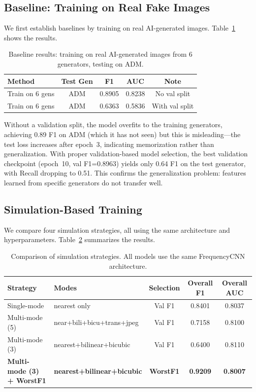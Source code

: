 \documentclass[11pt,a4paper]{article}
\begin{document}
\subsection{Baseline: Training on Real Fake Images}

We first establish baselines by training on real AI-generated images. Table~\ref{tab:baseline} shows the results.

\begin{table}[t]
\centering
\caption{Baseline results: training on real AI-generated images from 6 generators, testing on ADM.}
\label{tab:baseline}
\begin{tabular}{lcccc}
\toprule
Method & Test Gen & F1 & AUC & Note \\
\midrule
Train on 6 gens & ADM & 0.8905 & 0.8238 & No val split \\
Train on 6 gens & ADM & 0.6363 & 0.5836 & With val split \\
\bottomrule
\end{tabular}
\end{table}

Without a validation split, the model overfits to the training generators, achieving 0.89 F1 on ADM (which it has not seen) but this is misleading---the test loss increases after epoch~3, indicating memorization rather than generalization. With proper validation-based model selection, the best validation checkpoint (epoch~10, val F1=0.8963) yields only 0.64 F1 on the test generator, with Recall dropping to 0.51. This confirms the generalization problem: features learned from specific generators do not transfer well.

\subsection{Simulation-Based Training}

We compare four simulation strategies, all using the same architecture and hyperparameters. Table~\ref{tab:ablation} summarizes the results.

\begin{table}[t]
\centering
\caption{Comparison of simulation strategies. All models use the same FrequencyCNN architecture.}
\label{tab:ablation}
\begin{tabular}{llccc}
\toprule
Strategy & Modes & Selection & Overall F1 & Overall AUC \\
\midrule
Single-mode & nearest only & Val F1 & 0.8401 & 0.8037 \\
Multi-mode (5) & near+bili+bicu+trans+jpeg & Val F1 & 0.7158 & 0.8100 \\
Multi-mode (3) & nearest+bilinear+bicubic & Val F1 & 0.6400 & 0.8110 \\
\textbf{Multi-mode (3) + WorstF1} & \textbf{nearest+bilinear+bicubic} & \textbf{WorstF1} & \textbf{0.9209} & \textbf{0.8007} \\
\bottomrule
\end{tabular}
\end{table}
\end{document}
